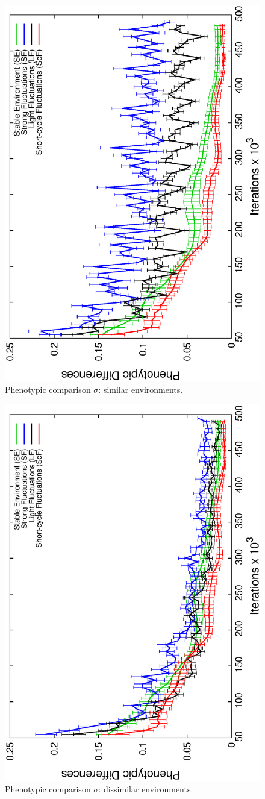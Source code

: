 \begin{figure}[h]
\centering
\includegraphics[width=0.7\columnwidth, angle=-90]{img/diffProp}
\caption{Phenotypic comparison $\sigma$: similar environments.}

\end{figure}
\begin{figure}[h]

\includegraphics[width=0.7\columnwidth, angle=-90]{img/ProgressProp}
\caption{Phenotypic comparison $\sigma$: dissimilar environments.}
\label{fig:similar}
\end{figure}

